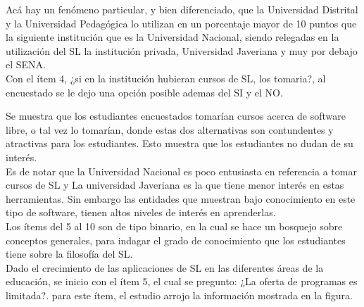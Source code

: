 \begin{multicols}{2}
Ac\'a hay un fen\'omeno particular, y bien diferenciado, que la Universidad Distrital y la Universidad Pedag\'ogica lo utilizan en un porcentaje mayor de 10 puntos que la siguiente instituci\'on que es la Universidad Nacional, siendo relegadas en la utilizaci\'on del SL la instituci\'on privada, Universidad Javeriana y muy por debajo el SENA.\\

Con el \'item 4, ¿si en la instituci\'on hubieran cursos de SL, los tomaria?, al encuestado se le dejo una opción posible ademas del SI y el NO. \\


\begin{center}
\end{center}

Se muestra que los estudiantes encuestados tomar\'ian cursos acerca de software libre, o tal vez lo tomarían, donde estas dos alternativas son contundentes y atractivas para los estudiantes. Esto muestra que los estudiantes no dudan de su interés.\\

Es de notar que la Universidad Nacional es poco entusiasta en referencia a tomar cursos de SL y  La universidad Javeriana es la que tiene menor interés en estas herramientas. Sin embargo las entidades que muestran bajo conocimiento en este tipo de software, tienen altos niveles de interés en aprenderlas.\\

Los ítems del 5 al 10 son de tipo binario, en la cual se hace un bosquejo sobre conceptos generales, para indagar el grado de conocimiento que los estudiantes tiene sobre la filosof\'ia del SL.\\

Dado el crecimiento de las aplicaciones de SL en las diferentes áreas de la educación, se inicio con el ítem 5, el cual se pregunto: ¿La oferta de programas es limitada?. para este ítem, el estudio arrojo la información mostrada en la figura.\\

\begin{center}
\end{center}


\end{multicols}
